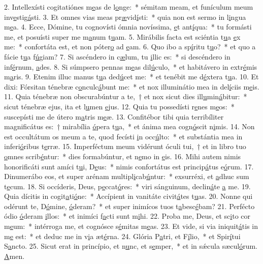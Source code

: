 2. Intellexísti cogitatiónes m\uline{e}as de l\uline{o}nge:~* sémitam meam, et funículum meum inv\uline{e}stig\uline{á}sti.
3. Et omnes vias meas pr\uline{æ}vid\uline{í}sti:~* quia non est sermo in l\uline{i}ngua m\uline{e}a.
4. Ecce, Dómine, tu cognovísti ómnia novíssima, \uline{e}t ant\uline{í}qua:~* tu formásti me, et posuísti super me m\uline{a}num t\uline{u}am.
5. Mirábilis facta est sciéntia t\uline{u}a \uline{e}x me:~* confortáta est, et non póter\uline{o} ad \uline{e}am.
6. Quo ibo a sp\uline{í}ritu t\uline{u}o?~* et quo a fácie t\uline{u}a f\uline{ú}giam?
7. Si ascéndero in c\uline{æ}lum, tu \uline{i}llic es:~* si descéndero in inf\uline{é}rnum, \uline{a}des.
8. Si súmpsero pennas m\uline{e}as dil\uline{ú}culo,~* et habitávero in extr\uline{é}mis m\uline{a}ris.
9. Etenim illuc manus t\uline{u}a ded\uline{ú}cet me:~* et tenébit me d\uline{é}xtera t\uline{u}a.
10. Et dixi: Fórsitan ténebræ c\uline{o}nculc\uline{á}bunt me:~* et nox illuminátio mea in del\uline{í}ciis m\uline{e}is.
11. Quia ténebræ non obscurabúntur a te,~† et nox sicut dies ill\uline{u}min\uline{á}bitur:~* sicut ténebræ ejus, ita et l\uline{u}men \uline{e}jus.
12. Quia tu possedísti r\uline{e}nes m\uline{e}os:~* suscepísti me de útero m\uline{a}tris m\uline{e}æ.
13. Confitébor tibi quia terribíliter magnificátus es:~† mirabília \uline{ó}pera t\uline{u}a,~* et ánima mea cogn\uline{ó}scit n\uline{i}mis.
14. Non est occultátum os meum a te, quod fecísti \uline{i}n occ\uline{ú}lto:~* et substántia mea in inferi\uline{ó}ribus t\uline{e}rræ.
15. Imperféctum meum vidérunt óculi tui,~† et in libro tuo \uline{o}mnes scrib\uline{é}ntur:~* dies formabúntur, et n\uline{e}mo in \uline{e}is.
16. Mihi autem nimis honorificáti sunt amíci t\uline{u}i, D\uline{e}us:~* nimis confortátus est princip\uline{á}tus e\uline{ó}rum.
17. Dinumerábo eos, et super arénam multipl\uline{i}cab\uline{ú}ntur:~* exsurréxi, et \uline{a}dhuc sum t\uline{e}cum.
18. Si occíderis, Deus, p\uline{e}ccat\uline{ó}res:~* viri sánguinum, declin\uline{á}te \uline{a} me.
19. Quia dícitis in cogit\uline{a}ti\uline{ó}ne:~* Accípient in vanitáte civit\uline{á}tes t\uline{u}as.
20. Nonne qui odérunt te, D\uline{ó}mine, \uline{ó}deram?~* et super inimícos tuos t\uline{a}besc\uline{é}bam?
21. Perfécto ódio \uline{ó}deram \uline{i}llos:~* et inimíci f\uline{a}cti sunt m\uline{i}hi.
22. Proba me, Deus, et sc\uline{i}to cor m\uline{e}um:~* intérroga me, et cognósce s\uline{é}mitas m\uline{e}as.
23. Et vide, si via iniquit\uline{á}tis in m\uline{e} est:~* et deduc me in v\uline{i}a æt\uline{é}rna.
24. Glória P\uline{a}tri, et F\uline{í}lio,~* et Spir\uline{í}tui S\uline{a}ncto.
25. Sicut erat in princípio, et n\uline{u}nc, et s\uline{e}mper,~* et in sǽcula sæcul\uline{ó}rum. \uline{A}men.
